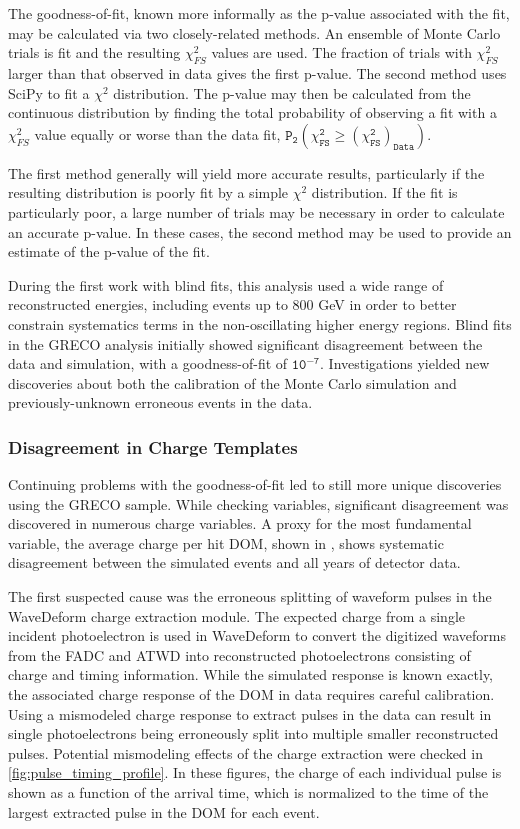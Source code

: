 The goodness-of-fit, known more informally as the p-value associated with the fit, may be calculated via two closely-related methods.
An ensemble of Monte Carlo trials is fit and the resulting $\chi_{FS}^2$ values are used.
The fraction of trials with $\chi_{FS}^2$ larger than that observed in data gives the first p-value.
The second method uses SciPy  to fit a $\chi^2$ distribution. 
The p-value may then be calculated from the continuous distribution by finding the total probability of observing a fit with a $\chi_{FS}^2$ value equally or worse than the data fit, $\mathtt{P_2\left(\chi_{FS}^2 \geq \left(\chi_{FS}^2\right)_{Data}\right)}$.

The first method generally will yield more accurate results, particularly if the resulting distribution is poorly fit by a simple $\chi^2$ distribution. 
If the fit is particularly poor, a large number of trials may be necessary in order to calculate an accurate p-value.
In these cases, the second method may be used to provide an estimate of the p-value of the fit.

During the first work with blind fits, this analysis used a wide range of reconstructed energies, including events up to 800 GeV in order to better constrain systematics terms in the non-oscillating higher energy regions.
Blind fits in the GRECO analysis initially showed significant disagreement between the data and simulation, with a goodness-of-fit of $\mathtt{10^{-7}}$.
Investigations yielded new discoveries about both the calibration of the Monte Carlo simulation and previously-unknown erroneous events in the data.

\label{subsubsec:charge_templates}
\subsubsection{Disagreement in Charge Templates}
Continuing problems with the goodness-of-fit led to still more unique discoveries using the GRECO sample.
While checking variables, significant disagreement was discovered in numerous charge variables.
A proxy for the most fundamental variable, the average charge per hit DOM, shown in , shows systematic disagreement between the simulated events and all years of detector data.

The first suspected cause was the erroneous splitting of waveform pulses in the WaveDeform charge extraction module.
The expected charge from a single incident photoelectron is used in WaveDeform to convert the digitized waveforms from the FADC and ATWD into reconstructed photoelectrons consisting of charge and timing information.
While the simulated response is known exactly, the associated charge response of the DOM in data requires careful calibration.
Using a mismodeled charge response to extract pulses in the data can result in single photoelectrons being erroneously split into multiple smaller reconstructed pulses.
Potential mismodeling effects of the charge extraction were checked in \ref{fig:pulse_timing_profile}. 
In these figures, the charge of each individual pulse is shown as a function of the arrival time, which is normalized to the time of the largest extracted pulse in the DOM for each event.

